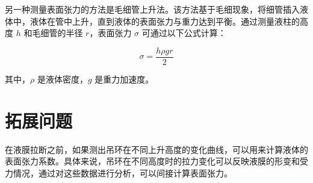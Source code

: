 \documentclass[UTF8]{ctexart}
\begin{document}
另一种测量表面张力的方法是毛细管上升法。该方法基于毛细现象，将细管插入液体中，液体在管中上升，直到液体的表面张力与重力达到平衡。通过测量液柱的高度 \(h\) 和毛细管的半径 \(r\)，表面张力 \(\sigma\) 可通过以下公式计算：

\begin{equation}
\sigma = \frac{h \rho g r}{2}
\end{equation}

其中，\(\rho\) 是液体密度，\(g\) 是重力加速度。

\section{拓展问题}

在液膜拉断之前，如果测出吊环在不同上升高度的变化曲线，可以用来计算液体的表面张力系数。具体来说，吊环在不同高度时的拉力变化可以反映液膜的形变和受力情况，通过对这些数据进行分析，可以间接计算表面张力。
\end{document}
